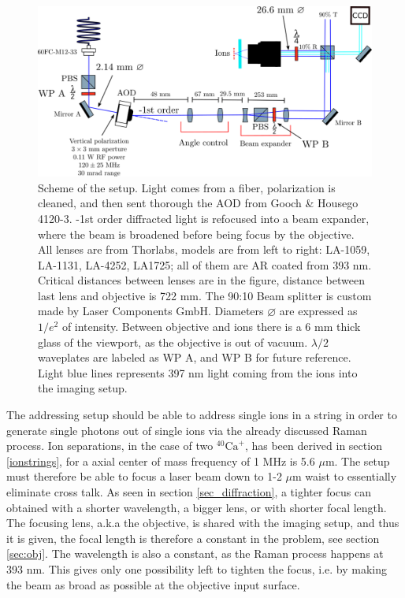 \begin{figure}[H]
\centering
\includegraphics[width=\textwidth]{img/setup}
\caption{Scheme of the setup. Light comes from a fiber, polarization is cleaned, and then sent thorough the AOD from Gooch \& Housego 4120-3. -1st order diffracted light is refocused into a beam expander, where the beam is broadened before being focus by the objective. All lenses are from Thorlabs, models are from left to right: LA-1059, LA-1131, LA-4252, LA1725; all of them are AR coated from 393 nm. Critical distances between lenses are in the figure, distance between last lens and objective is 722 mm. The 90:10 Beam splitter is custom made by Laser Components GmbH. Diameters $\varnothing$ are expressed as $1/e^2$ of intensity. Between objective and ions there is a 6 mm thick glass of the viewport, as the objective is out of vacuum. $\lambda/2$ waveplates are labeled as WP A, and WP B for future reference. Light blue lines represents 397 nm light coming from the ions into the imaging setup.}
\label{addressingsetup}
\end{figure}
The addressing setup should be able to address single ions in a string in order to generate single photons out of single ions via the already discussed Raman process. Ion separations, in the case of two $^{40}\text{Ca}^+$, has been derived in section \ref{ionstrings}, for a axial center of mass frequency of 1 MHz is 5.6 $\mu$m. The setup must therefore be able to focus a laser beam down to 1-2 $\mu$m waist to essentially eliminate cross talk. As seen in section \ref{sec_diffraction}, a tighter focus can obtained with a shorter wavelength, a bigger lens, or with shorter focal length. The focusing lens, a.k.a the objective, is shared with the imaging setup, and thus it is given, the focal length is therefore a constant in the problem, see section \ref{sec:obj}. The wavelength is also a constant, as the Raman process happens at 393 nm. This gives only one possibility left to tighten the focus, i.e. by making the beam as broad as possible at the objective input surface.\\
